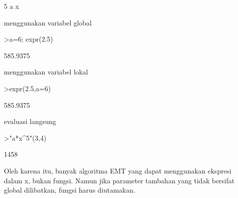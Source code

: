 \documentclass{article}
\begin{document}
\begin{eulernotebook}
\begin{eulercomment}
\begin{eulercomment}
\begin{eulercomment}
\begin{eulercomment}
\begin{euleroutput}
                                      5
                                   a x
  
\end{euleroutput}
\begin{eulercomment}
menggunakan variabel global 
\end{eulercomment}
\begin{eulerprompt}
>a=6; expr(2.5)
\end{eulerprompt}
\begin{euleroutput}
  585.9375
\end{euleroutput}
\begin{eulercomment}
menggunakan variabel lokal
\end{eulercomment}
\begin{eulerprompt}
>expr(2.5,a=6)
\end{eulerprompt}
\begin{euleroutput}
  585.9375
\end{euleroutput}
\begin{eulercomment}
evaluasi langsung
\end{eulercomment}
\begin{eulerprompt}
>"a*x^5"(3,4)
\end{eulerprompt}
\begin{euleroutput}
  1458
\end{euleroutput}
\begin{eulercomment}
Oleh karena itu, banyak algoritma EMT yang dapat menggunakan ekspresi
dalam x, bukan fungsi. Namun jika parameter tambahan yang tidak
bersifat global dilibatkan, fungsi harus diutamakan.


\end{eulercomment}
\end{eulercomment}
\end{eulercomment}
\end{eulercomment}
\end{eulercomment}
\end{eulernotebook}
\end{document}
